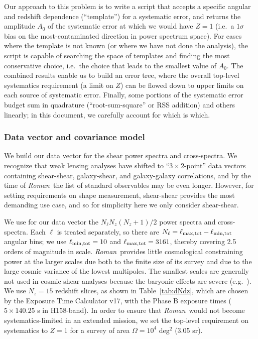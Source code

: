 \documentclass[usenatbib]{mnras}
\newcommand{\wfirst}{{\slshape Roman}}
\begin{document}
Our approach to this problem is to write a script that accepts a
specific angular and redshift dependence (``template'') for a
systematic error, and returns the amplitude $A_0$ of the systematic
error at which we would have $Z=1$ (i.e.\ a $1\sigma$ bias on the
most-contaminated direction in power spectrum space). For cases where
the template is not known (or where we have not done the analysis),
the script is capable of searching the space of templates and finding
the most conservative choice, i.e.\ the choice that leads to the
smallest value of $A_0$. The combined results enable us to build an
error tree, where the overall top-level systematics requirement (a
limit on $Z$) can be flowed down to upper limits on each source of
systematic error. Finally, some portions of the systematic error
budget sum in quadrature (``root-sum-square'' or RSS addition) and
others linearly; in this document, we carefully account for which is
which.

\subsubsection{Data vector and covariance model}

We build our data vector for the shear power spectra and cross-spectra. We recognize that weak lensing analyses have shifted to ``$3\times 2$-point'' data vectors containing shear-shear, galaxy-shear, and galaxy-galaxy correlations, and by the time of \wfirst\ the list of standard observables may be even longer. However, for setting requirements on shape measurement, shear-shear provides the most demanding use case, and so for simplicity here we only consider shear-shear.

We use for our data vector the $N_\ell N_z(N_z+1)/2$ power spectra and
cross-spectra. Each $\ell$ is treated separately, so there are
$N_\ell=\ell_{\rm max,tot}-\ell_{\rm min,tot}$ angular bins; we use
$\ell_{\rm min,tot}=10$ and $\ell_{\rm max,tot}=3161$, thereby
covering 2.5 orders of magnitude in scale. \wfirst\ provides little
cosmological constraining power at the larger scales due both to the
finite size of its survey and due to the large cosmic variance of the
lowest multipoles. The smallest scales are generally not used in
cosmic shear analyses because the baryonic effects are severe (e.g.\
\cite{2008PhRvD..77d3507Z, 2013PhRvD..87d3509Z}). We use $N_z=15$
redshift slices, as shown in Table~\ref{tab:dNdz}, which are chosen by the Exposure Time Calculator \citep{2012arXiv1204.5151H} v17, with the Phase B exposure times ($5\times 140.25$ s in H158-band). In order to ensure
that \wfirst\ would not become systematics-limited in an extended
mission, we set the top-level requirement on systematics to $Z=1$ for
a survey of area $\Omega =10^4$ deg$^2$ (3.05 sr).
\end{document}
